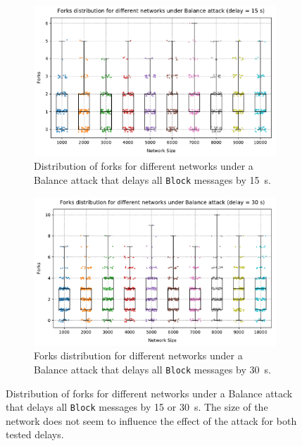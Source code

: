 \begin{figure}[ht]
	\begin{subfigure}{\textwidth}
		\centering
		\includegraphics[width=\myplotswitdth \columnwidth]{plots/forks_attack_delay_15_network_sizes_boxplot}
		\vspace*{0.25cm}
		\caption{Distribution of forks for different networks under a Balance attack that delays all \texttt{Block} messages by \SI{15}{\second}.}
		\vspace*{0.25cm}
	\end{subfigure}
	\begin{subfigure}{\textwidth}
		\centering
		\vspace*{0.25cm}
		\includegraphics[width=\myplotswitdth \columnwidth]{plots/forks_attack_delay_30_network_sizes_boxplot}
		\vspace*{0.25cm}
		\caption{Forks distribution for different networks under a Balance attack that delays all \texttt{Block} messages by \SI{30}{\second}.}
		\vspace*{0.75cm}
	\end{subfigure}
	\caption[Forks distribution for different networks under Balance attack]{
		Distribution of forks for different networks under a Balance attack that delays all \texttt{Block} messages by \num{15} or \SI{30}{\second}.
		The size of the network does not seem to influence the effect of the attack for both tested delays.
	}
	\label{fig:forks-attack-sizes}
\end{figure}

